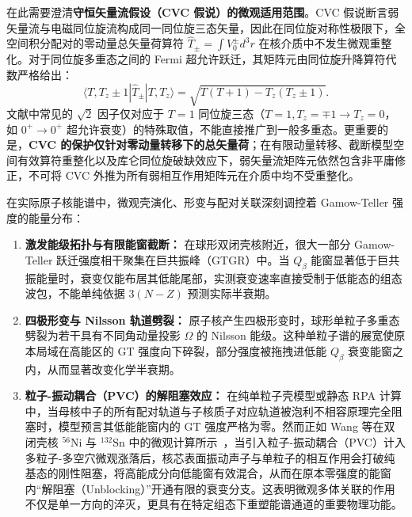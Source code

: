 在此需要澄清\textbf{守恒矢量流假设（CVC 假说）的微观适用范围}。CVC 假说断言弱矢量流与电磁同位旋流构成同一同位旋三态矢量，因此在同位旋对称性极限下，全空间积分配对的零动量总矢量荷算符 $\hat{T}_\pm = \int V_0^\pm d^3r$ 在核介质中不发生微观重整化。对于同位旋多重态之间的 Fermi 超允许跃迁，其矩阵元由同位旋升降算符代数严格给出：
\begin{equation}\label{eq:4-7-fermi-matrix-element}
\langle T, T_z \pm 1 | \hat{T}_\pm | T, T_z \rangle = \sqrt{T(T+1) - T_z(T_z \pm 1)}.
\end{equation}
文献中常见的 $\sqrt{2}$ 因子仅对应于 $T=1$ 同位旋三态（$T=1, T_z = \mp 1 \to T_z = 0$，如 $0^+ \to 0^+$ 超允许衰变）的特殊取值，不能直接推广到一般多重态。更重要的是，\textbf{CVC 的保护仅针对零动量转移下的总矢量荷}；在有限动量转移、截断模型空间有效算符重整化以及库仑同位旋破缺效应下，弱矢量流矩阵元依然包含非平庸修正，不可将 CVC 外推为所有弱相互作用矩阵元在介质中均不受重整化。

在实际原子核能谱中，微观壳演化、形变与配对关联深刻调控着 Gamow-Teller 强度的能量分布：
\begin{enumerate}
\item \textbf{激发能级拓扑与有限能窗截断：} 在球形双闭壳核附近，很大一部分 Gamow-Teller 跃迁强度相干聚集在巨共振峰（GTGR）中。当 $Q_\beta$ 能窗显著低于巨共振能量时，衰变仅能布居其低能尾部，实测衰变速率直接受制于低能态的组态波包，不能单纯依据 $3(N-Z)$ 预测实际半衰期。
\item \textbf{四极形变与 Nilsson 轨道劈裂：} 原子核产生四极形变时，球形单粒子多重态劈裂为若干具有不同角动量投影 $\Omega$ 的 Nilsson 能级。这种单粒子谱的展宽使原本局域在高能区的 GT 强度向下碎裂，部分强度被拖拽进低能 $Q_\beta$ 衰变能窗之内，从而显著改变化学半衰期。
\item \textbf{粒子-振动耦合（PVC）的解阻塞效应：} 在纯单粒子壳模型或静态 RPA 计算中，当母核中子的所有配对轨道与子核质子对应轨道被泡利不相容原理完全阻塞时，模型预言其低能能窗内的 GT 强度严格为零。然而正如 Wang 等在双闭壳核 $^{56}\mathrm{Ni}$ 与 $^{132}\mathrm{Sn}$ 中的微观计算所示~\cite{wang-2026-axial-coupling-quenching-joint-effects}，当引入粒子-振动耦合（PVC）计入多粒子-多空穴微观涨落后，核芯表面振动声子与单粒子的相互作用会打破纯基态的刚性阻塞，将高能成分向低能窗有效混合，从而在原本零强度的能窗内“解阻塞（Unblocking）”开通有限的衰变分支。这表明微观多体关联的作用不仅是单一方向的淬灭，更具有在特定组态下重塑能谱通道的重要物理功能。
\end{enumerate}

